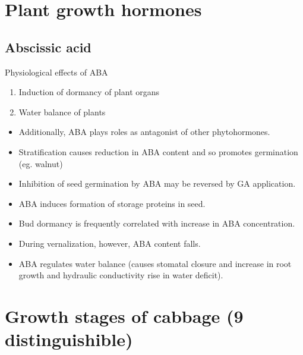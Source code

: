 \documentclass[
  openany]{book}
\providecommand{\tightlist}{%
  \setlength{\itemsep}{0pt}\setlength{\parskip}{0pt}}
\begin{document}
\hypertarget{plant-growth-hormones}{%
\section{Plant growth hormones}\label{plant-growth-hormones}}

\hypertarget{abscissic-acid}{%
\subsection{Abscissic acid}\label{abscissic-acid}}

Physiological effects of ABA

\begin{enumerate}
\def\labelenumi{\arabic{enumi}.}
\tightlist
\item
  Induction of dormancy of plant organs
\item
  Water balance of plants
\end{enumerate}

\begin{itemize}
\tightlist
\item
  Additionally, ABA plays roles as antagonist of other phytohormones.
\item
  Stratification causes reduction in ABA content and so promotes germination (eg. walnut)
\item
  Inhibition of seed germination by ABA may be reversed by GA application.
\item
  ABA induces formation of storage proteins in seed.
\item
  Bud dormancy is frequently correlated with increase in ABA concentration.
\item
  During vernalization, however, ABA content falls.
\item
  ABA regulates water balance (causes stomatal closure and increase in root growth and hydraulic conductivity rise in water deficit).
\end{itemize}

\hypertarget{growth-stages-of-cabbage-9-distinguishible}{%
\section{Growth stages of cabbage (9 distinguishible)}\label{growth-stages-of-cabbage-9-distinguishible}}
\end{document}
